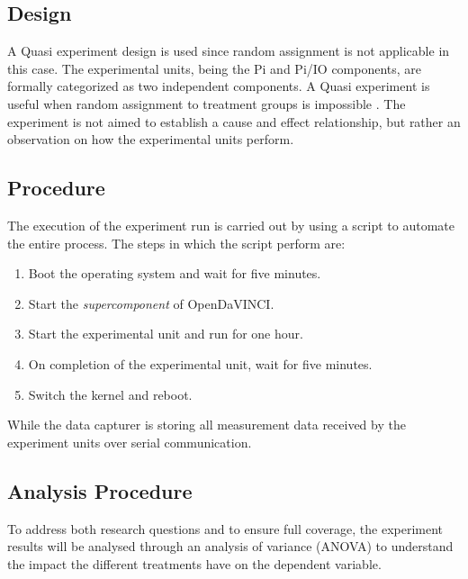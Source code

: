 \subsection{Design}
A Quasi experiment design is used since random assignment is not applicable in this case. The experimental units, being the Pi and Pi/IO components, are
formally categorized as two independent components. A Quasi experiment is useful when random assignment to treatment groups is impossible \cite{juristo2003lecture}. The experiment is not aimed to establish a cause and effect relationship, but rather an observation on how the experimental units perform.



\subsection{Procedure}

The execution of the experiment run is carried out by using a script to automate the entire process. The steps in which the script perform are:\\

\begin{enumerate}  
\item Boot the operating system and wait for five minutes.  
\item Start the \textit{supercomponent} of OpenDaVINCI.
\item Start the experimental unit and run for one hour.
\item On completion of the experimental unit, wait for five minutes.
\item Switch the kernel and reboot.\\ 
\end{enumerate}

While the data capturer is storing all measurement data received by the experiment units over serial communication. 

\subsection{Analysis Procedure}
To address both research questions and to ensure full coverage, the experiment results will be analysed through an analysis of variance (ANOVA) to understand the impact the different treatments have on the dependent variable.\\









